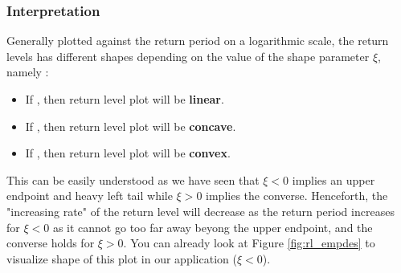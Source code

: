 \subsubsection*{Interpretation}

Generally plotted against the return period on a logarithmic scale, the return levels has different shapes depending on the value of the shape parameter $\xi$, namely :

\begin{itemize}
	\item If , then return level plot will be \textbf{linear}.
     \item If , then return level plot will be \textbf{concave}.
     \item If , then return level plot will be \textbf{convex}.
\end{itemize}
This can be easily understood as we have seen that $\xi<0$ implies an upper endpoint and heavy left tail while $\xi>0$ implies the converse. Henceforth, the "increasing rate" of the return level will decrease as the return period increases for $\xi<0$ as it cannot go too far away beyong the upper endpoint, and the converse holds for $\xi>0$.
You can already look at Figure \ref{fig:rl_empdes} to visualize shape of this plot in our application ($\xi<0$).

\iffalse
